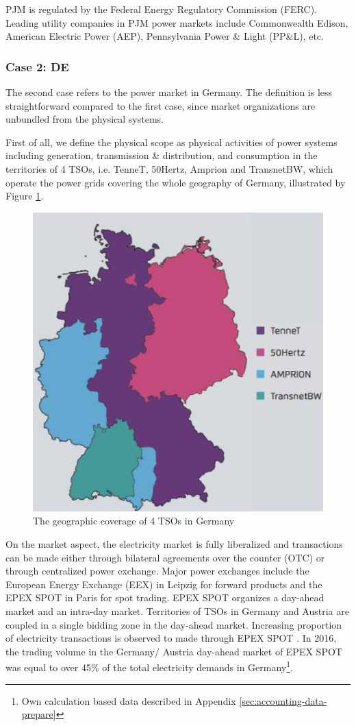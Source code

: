 PJM is regulated by the Federal Energy Regulatory Commission (FERC). Leading utility companies in PJM power markets include Commonwealth Edison, American Electric Power (AEP), Pennsylvania Power \& Light (PP\&L), etc.

\subsubsection{Case 2: DE}

The second case refers to the power market in Germany. The definition is less straightforward compared to the first case, since market organizations are unbundled from the physical systems. 

First of all, we define the physical scope as physical activities of power systems including generation, transmission \& distribution, and consumption in the territories of 4 TSOs, i.e. TenneT, 50Hertz, Amprion and TransnetBW, which operate the power grids covering the whole geography of Germany, illustrated by Figure \ref{fig:germany-map}. 

\begin{figure}[h!]
	\centering
	\includegraphics[width=0.7\linewidth]{Figures/Germany_TSOs}
	\caption{The geographic coverage of 4 TSOs in Germany \cite{Bayer2015}}
	\label{fig:germany-map}
\end{figure}

On the market aspect, the electricity market is fully liberalized and transactions can be made either through bilateral agreements over the counter (OTC) or through centralized power exchange. Major power exchanges include the European Energy Exchange (EEX) in Leipzig for forward products and the EPEX SPOT in Paris for spot trading. EPEX SPOT organizes a day-ahead market and an intra-day market. Territories of TSOs in Germany and Austria are coupled in a single bidding zone in the day-ahead market. Increasing proportion of electricity transactions is observed to made through EPEX SPOT \cite{Bayer2015}. In 2016, the trading volume in the Germany/ Austria day-ahead market of EPEX SPOT was equal to over 45\% of the total electricity demands in Germany\footnote{Own calculation based data described in Appendix \ref{sec:accounting-data-prepare}}. 

